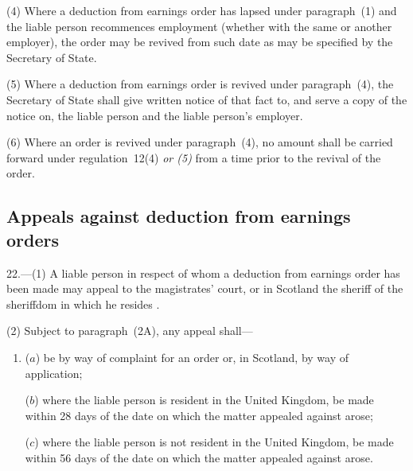 \documentclass[12pt,a4paper]{article}
\begin{document}
(4) Where a deduction from earnings order has lapsed under paragraph~(1) and the liable person recommences employment (whether with the same or another employer), the order may be revived from such date as may be specified by the Secretary of State.

(5) Where a deduction from earnings order is revived under paragraph~(4), the Secretary of State shall give written notice of that fact to, and serve a copy of the notice on, the liable person and the liable person’s employer.

(6) Where an order is revived under paragraph~(4), no amount shall be carried forward under regulation~12(4)  
\emph{or (5)}   %
from a time prior to the revival of the order.


\subsection[22. Appeals against deduction from earnings orders]{Appeals against deduction from earnings orders}

22.—(1) A liable person in respect of whom a deduction from earnings order has been made may appeal to the magistrates' court, or in Scotland the sheriff
of the sheriffdom in which he resides%
.

(2) 
Subject to paragraph~(2A),  %
any appeal shall—
\begin{enumerate}\item[]
($a$) be by way of complaint for an order or, in Scotland, by way of application;

($b$) 
where the liable person is resident in the United Kingdom,  %
be made within 28 days of the date on which the matter appealed against arose;

($c$) where the liable person is not resident in the United Kingdom, be made within 56 days of the date on which the matter appealed against arose.
\end{enumerate}
\end{document}
